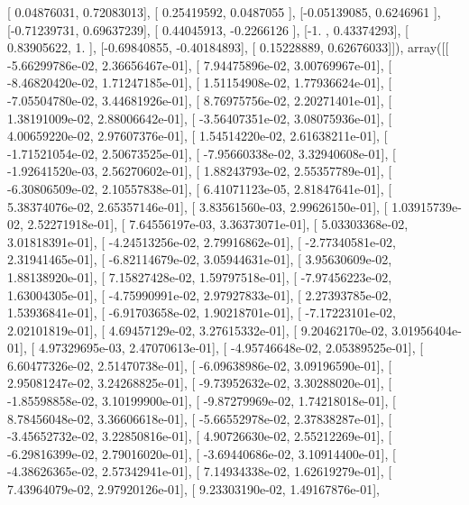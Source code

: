 \documentclass{article}
\begin{document}
       [ 0.04876031,  0.72083013],
       [ 0.25419592,  0.0487055 ],
       [-0.05139085,  0.6246961 ],
       [-0.71239731,  0.69637239],
       [ 0.44045913, -0.2266126 ],
       [-1.        ,  0.43374293],
       [ 0.83905622,  1.        ],
       [-0.69840855, -0.40184893],
       [ 0.15228889,  0.62676033]]), array([[ -5.66299786e-02,   2.36656467e-01],
       [  7.94475896e-02,   3.00769967e-01],
       [ -8.46820420e-02,   1.71247185e-01],
       [  1.51154908e-02,   1.77936624e-01],
       [ -7.05504780e-02,   3.44681926e-01],
       [  8.76975756e-02,   2.20271401e-01],
       [  1.38191009e-02,   2.88006642e-01],
       [ -3.56407351e-02,   3.08075936e-01],
       [  4.00659220e-02,   2.97607376e-01],
       [  1.54514220e-02,   2.61638211e-01],
       [ -1.71521054e-02,   2.50673525e-01],
       [ -7.95660338e-02,   3.32940608e-01],
       [ -1.92641520e-03,   2.56270602e-01],
       [  1.88243793e-02,   2.55357789e-01],
       [ -6.30806509e-02,   2.10557838e-01],
       [  6.41071123e-05,   2.81847641e-01],
       [  5.38374076e-02,   2.65357146e-01],
       [  3.83561560e-03,   2.99626150e-01],
       [  1.03915739e-02,   2.52271918e-01],
       [  7.64556197e-03,   3.36373071e-01],
       [  5.03303368e-02,   3.01818391e-01],
       [ -4.24513256e-02,   2.79916862e-01],
       [ -2.77340581e-02,   2.31941465e-01],
       [ -6.82114679e-02,   3.05944631e-01],
       [  3.95630609e-02,   1.88138920e-01],
       [  7.15827428e-02,   1.59797518e-01],
       [ -7.97456223e-02,   1.63004305e-01],
       [ -4.75990991e-02,   2.97927833e-01],
       [  2.27393785e-02,   1.53936841e-01],
       [ -6.91703658e-02,   1.90218701e-01],
       [ -7.17223101e-02,   2.02101819e-01],
       [  4.69457129e-02,   3.27615332e-01],
       [  9.20462170e-02,   3.01956404e-01],
       [  4.97329695e-03,   2.47070613e-01],
       [ -4.95746648e-02,   2.05389525e-01],
       [  6.60477326e-02,   2.51470738e-01],
       [ -6.09638986e-02,   3.09196590e-01],
       [  2.95081247e-02,   3.24268825e-01],
       [ -9.73952632e-02,   3.30288020e-01],
       [ -1.85598858e-02,   3.10199900e-01],
       [ -9.87279969e-02,   1.74218018e-01],
       [  8.78456048e-02,   3.36606618e-01],
       [ -5.66552978e-02,   2.37838287e-01],
       [ -3.45652732e-02,   3.22850816e-01],
       [  4.90726630e-02,   2.55212269e-01],
       [ -6.29816399e-02,   2.79016020e-01],
       [ -3.69440686e-02,   3.10914400e-01],
       [ -4.38626365e-02,   2.57342941e-01],
       [  7.14934338e-02,   1.62619279e-01],
       [  7.43964079e-02,   2.97920126e-01],
       [  9.23303190e-02,   1.49167876e-01],
\end{document}
